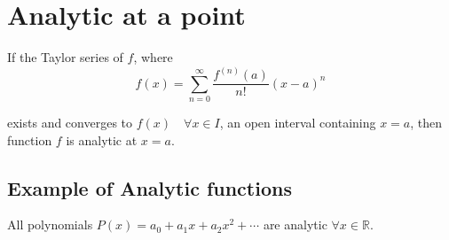 \newpage
\section{Analytic at a point}

\begin{definition}
    If the Taylor series of $f$, where 
    \begin{equation}
        f(x) = \sum^\infty_{n=0} \frac{f^{(n)}(a)}{n!}(x-a)^n
    \end{equation}

    exists and converges to $f(x) \quad \forall x \in I$, an open interval containing $x = a$, 
    then function $f$ is analytic at $x = a$. 

\end{definition}

\subsection*{Example of Analytic functions}
All polynomials $P(x) = a_0 + a_1x + a_2x^2 + \cdots$ are analytic $\forall x \in \mathbb{R}$.

